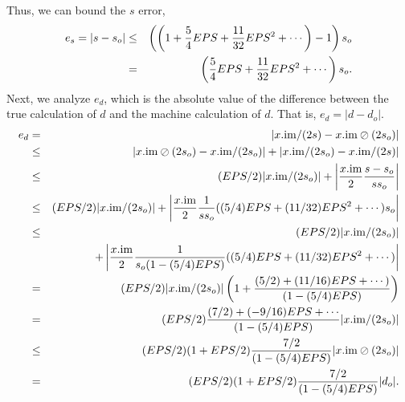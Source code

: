 Thus, we can bound the $s$ error, 
\begin{eqnarray*}
e_s = |s - s_o|&\le&\left(\left(1 + {5 \over 4} EPS + {11 \over 32} EPS^2 +\cdots\right) - 1\right) s_o\\
&=& \left({5 \over 4} EPS +
{11 \over 32} EPS^2 +\cdots\right) s_o.
\end{eqnarray*}
Next, we analyze $e_d$, which is the absolute value of the difference between the true calculation of $d$ and the machine calculation of $d$.  That is, $e_d = |d - d_o|.$
\begin{eqnarray*}
e_d &=& |x.{\rm im}/(2s) - x.{\rm im} \oslash (2 s_o)|\\
&\le& |x.{\rm im} \oslash (2 s_o) - x.{\rm im} / (2 s_o)| + 
|x.{\rm im}/(2s_o) - x.{\rm im}/(2s) |\\
&\le& (EPS/2) |x.{\rm im} / (2 s_o)| + \left|{x.{\rm im} \over 2} {s - s_o \over s s_o} \right|\\
&\le& (EPS/2) |x .{\rm im}/ (2
s_o)| +\left|{x.{\rm im} \over 2} {1 \over s s_o} ((5/4)EPS + (11/32)EPS^2+\cdots) s_o\right|\\
&\le& (EPS/2) |x.{\rm im} / (2
s_o)| \\
&&+ \left|{x.{\rm im} \over 2} {1 \over s_o (1 - (5/4)EPS)}((5/4)EPS + (11/32)EPS^2+\cdots)\right|\\
&= &(EPS/2) |x .{\rm
im}/ (2 s_o)| \left(1 + {(5/2) + (11/16)EPS+\cdots) \over (1 - (5/4)EPS)}\right)\\
&= &(EPS/2) {(7/2) + (-9/16) EPS +\cdots\over
(1 - (5/4)EPS)} |x .{\rm im}/ (2 s_o)|\\
&\le& (EPS/2) (1+EPS/2)
 {7/2 \over (1 - (5/4)EPS)}
|x .{\rm im} \oslash (2 s_o)|\\
&= &(EPS/2) (1+EPS/2)
 {7/2 \over (1 - (5/4)EPS)}
|d_o|.
\end{eqnarray*}
 
